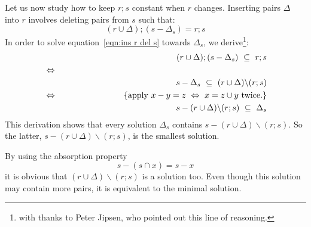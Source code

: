 \documentclass{svproc}
\begin{document}
	Let us now study how to keep $r;s$ constant when $r$ changes.
	Inserting pairs $\Delta$ into $r$ involves deleting pairs from $s$ such that:
\begin{equation}
(r\cup \Delta);(s-\Delta_s)=r;s\label{eqn:ins r del s}
\end{equation}
	In order to solve equation~\ref{eqn:ins r del s} towards $\Delta_s$,
	we derive\footnote{with thanks to Peter Jipsen, who pointed out this line of reasoning.}:
\begin{eqnarray}
&&(r\cup \Delta);(s-\Delta_s)\ \subs\ r;s\label{eqn:rs subs t by ins r del s}\\
&\Leftrightarrow&\nonumber\\
&&s-\Delta_s\ \subs\ (r\cup \Delta)\backslash(r;s)\nonumber\\
&\Leftrightarrow&\hspace{1in}\{\text{apply }x-y=z\ \Leftrightarrow\ x=z\cup y\text{ twice.}\}\nonumber\\
&&s-(r\cup \Delta)\backslash(r;s)\ \subs\ \Delta_s\nonumber
\end{eqnarray}
	This derivation shows that every solution $\Delta_s$ contains $s-(r\cup \Delta)\backslash(r;s)$.
	So the latter, $s-(r\cup \Delta)\backslash(r;s)$, is the smallest solution.

	By using the absorption property
\begin{equation}
s-(s\cap x)=s-x\label{absorb x}
\end{equation}
	it is obvious that $(r\cup \Delta)\backslash(r;s)$ is a solution too.
	Even though this solution may contain more pairs, it is equivalent to the minimal solution.
\end{document}
